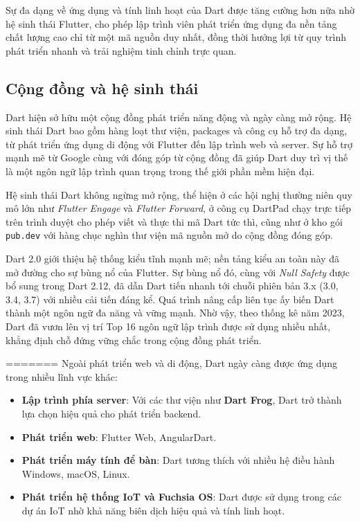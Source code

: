 \documentclass[../DoAn.tex]{subfiles}
\numberwithin{figure}{chapter}
\begin{document}
Sự đa dạng về ứng dụng và tính linh hoạt của Dart được tăng cường hơn nữa nhờ hệ sinh thái Flutter, cho phép lập trình viên phát triển ứng dụng đa nền tảng chất lượng cao chỉ từ một mã nguồn duy nhất, đồng thời hưởng lợi từ quy trình phát triển nhanh và trải nghiệm tinh chỉnh trực quan.



\subsection{Cộng đồng và hệ sinh thái}
Dart hiện sở hữu một cộng đồng phát triển năng động và ngày càng mở rộng. Hệ sinh thái Dart bao gồm hàng loạt thư viện, packages và công cụ hỗ trợ đa dạng, từ phát triển ứng dụng di động với Flutter đến lập trình web và server. Sự hỗ trợ mạnh mẽ từ Google cùng với đóng góp từ cộng đồng đã giúp Dart duy trì vị thế là một ngôn ngữ lập trình quan trọng trong thế giới phần mềm hiện đại.


Hệ sinh thái Dart không ngừng mở rộng, thể hiện ở các hội nghị thường niên quy mô lớn như \textit{Flutter Engage} và \textit{Flutter Forward}, ở công cụ DartPad chạy trực tiếp trên trình duyệt cho phép viết và thực thi mã Dart tức thì, cũng như ở kho gói \texttt{pub.dev} với hàng chục nghìn thư viện mã nguồn mở do cộng đồng đóng góp.









Dart 2.0 giới thiệu hệ thống kiểu tĩnh mạnh mẽ; nền tảng kiểu an toàn này đã mở đường cho sự bùng nổ của Flutter. Sự bùng nổ đó, cùng với \textit{Null Safety} được bổ sung trong Dart 2.12, đã dẫn Dart tiến nhanh tới chuỗi phiên bản 3.x (3.0, 3.4, 3.7) với nhiều cải tiến đáng kể. Quá trình nâng cấp liên tục ấy biến Dart thành một ngôn ngữ đa năng và vững mạnh. Nhờ vậy, theo thống kê năm 2023, Dart đã vươn lên vị trí Top 16 ngôn ngữ lập trình được sử dụng nhiều nhất, khẳng định chỗ đứng vững chắc trong cộng đồng phát triển.

=======
Ngoài phát triển web và di động, Dart ngày càng được ứng dụng trong nhiều lĩnh vực khác:

\begin{itemize}
    \item \textbf{Lập trình phía server}: Với các thư viện như \textbf{Dart Frog}, Dart trở thành lựa chọn hiệu quả cho phát triển backend.
    \item \textbf{Phát triển web}: Flutter Web, AngularDart.
    \item \textbf{Phát triển máy tính để bàn}: Dart tương thích với nhiều hệ điều hành Windows, macOS, Linux.
    \item \textbf{Phát triển hệ thống IoT và Fuchsia OS}: Dart được sử dụng trong các dự án IoT nhờ khả năng biên dịch hiệu quả và tính linh hoạt.
\end{itemize}
\end{document}
